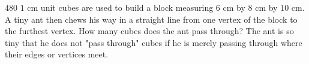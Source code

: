 $480$ $1$ cm unit cubes are used to build a block measuring $6$ cm by $8$ cm by $10$ cm. A tiny ant then chews his way in a straight line from one vertex of the block to the furthest vertex. How many cubes does the ant pass through? The ant is so tiny that he does not "pass through" cubes if he is merely passing through where their edges or vertices meet.